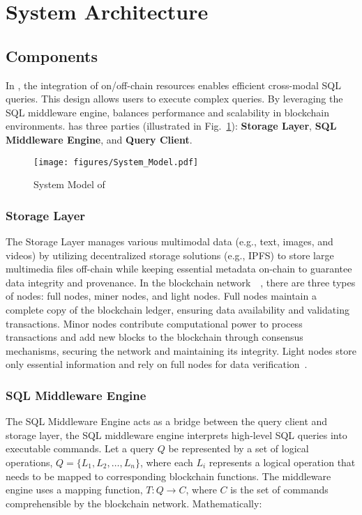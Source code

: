 \section{System Architecture}


\subsection{Components}
In \Chain, the integration of on/off-chain resources enables efficient cross-modal SQL queries. 
This design allows users to execute complex queries. 
By leveraging the SQL middleware engine, \Chain balances performance and scalability in blockchain environments.
\Chain has three parties (illustrated in Fig.~\ref{fig:overview}):  \textbf{Storage Layer},  \textbf{SQL Middleware Engine}, and  \textbf{Query Client}.



\begin{figure}[htbp]
    \centering
    \texttt{[image: figures/System\_Model.pdf]}
    \caption{System Model of \Chain}
    \label{fig:overview}
\end{figure}






\subsubsection{Storage Layer}
The Storage Layer manages various multimodal data (e.g., text, images, and videos) by utilizing decentralized storage solutions (e.g., IPFS) to store large multimedia files off-chain while keeping essential metadata on-chain to guarantee data integrity and provenance. 
In the blockchain network~\cite{nakamoto2008bitcoin}~\cite{wood2014ethereum}, there are three types of nodes: full nodes, miner nodes, and light nodes. 
Full nodes maintain a complete copy of the blockchain ledger, ensuring data availability and validating transactions. 
Minor nodes contribute computational power to process transactions and add new blocks to the blockchain through consensus mechanisms, securing the network and maintaining its integrity. Light nodes store only essential information and rely on full nodes for data verification~\cite{V2FS2024}.


\subsubsection{SQL Middleware Engine}
The SQL Middleware Engine acts as a bridge between the query client and storage layer, the SQL middleware engine interprets high-level SQL queries into executable commands. Let a query \( Q \) be represented by a set of logical operations, \( Q = \{ L_1, L_2, \ldots, L_n \} \), where each \( L_i \) represents a logical operation that needs to be mapped to corresponding blockchain functions. The middleware engine uses a mapping function, \( T: Q \to C \), where \( C \) is the set of commands comprehensible by the blockchain network. Mathematically:


